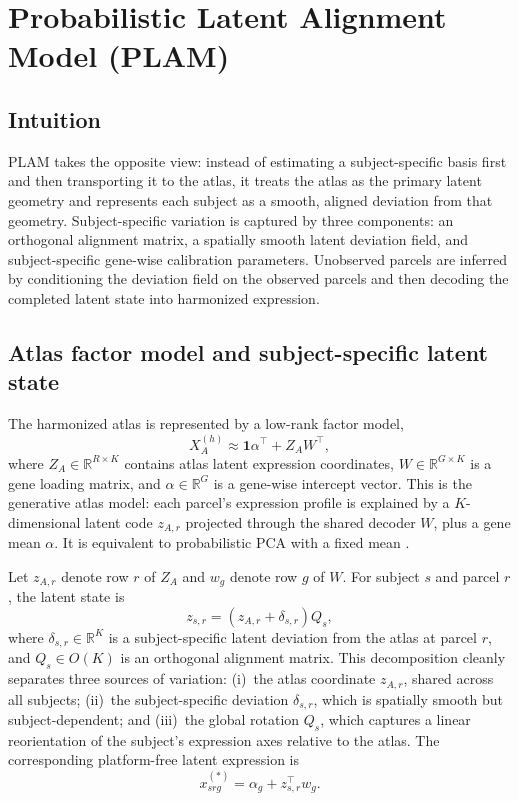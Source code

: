 \documentclass[11pt]{article}
\numberwithin{equation}{section}
\begin{document}
\section{Probabilistic Latent Alignment Model (PLAM)}
\subsection{Intuition}
PLAM takes the opposite view: instead of estimating a
subject-specific basis first and then transporting it to the atlas, it treats the atlas
as the primary latent geometry and represents each subject as a smooth, aligned
deviation from that geometry.  Subject-specific variation is captured by three
components: an orthogonal alignment matrix, a spatially smooth latent deviation field,
and subject-specific gene-wise calibration parameters.  Unobserved parcels are inferred
by conditioning the deviation field on the observed parcels and then decoding the
completed latent state into harmonized expression.

\subsection{Atlas factor model and subject-specific latent state}
The harmonized atlas is represented by a low-rank factor model,
\begin{equation}
  \label{eq:prob-atlas-factor}
  X_A^{(h)} \approx \mathbf{1}\alpha^\top + Z_A W^\top,
\end{equation}
where $Z_A\in\mathbb{R}^{R\times K}$ contains atlas latent expression coordinates,
$W\in\mathbb{R}^{G\times K}$ is a gene loading matrix, and $\alpha\in\mathbb{R}^G$ is
a gene-wise intercept vector.  This is the generative atlas model: each parcel's
expression profile is explained by a $K$-dimensional latent code $z_{A,r}$ projected
through the shared decoder $W$, plus a gene mean $\alpha$.  It is equivalent to
probabilistic PCA with a fixed mean \cite{tipping1999ppca}.

Let $z_{A,r}$ denote row $r$ of $Z_A$ and $w_g$ denote row $g$ of $W$.  For subject
$s$ and parcel $r$, the latent state is
\begin{equation}
  \label{eq:prob-latent-state}
  z_{s,r} = \left(z_{A,r} + \delta_{s,r}\right)Q_s,
\end{equation}
where $\delta_{s,r}\in\mathbb{R}^K$ is a subject-specific latent deviation from the
atlas at parcel $r$, and $Q_s\in O(K)$ is an orthogonal alignment matrix.  This
decomposition cleanly separates three sources of variation: (i)~the atlas coordinate
$z_{A,r}$, shared across all subjects; (ii)~the subject-specific deviation
$\delta_{s,r}$, which is spatially smooth but subject-dependent; and (iii)~the global
rotation $Q_s$, which captures a linear reorientation of the subject's expression axes
relative to the atlas.  The corresponding platform-free latent expression is
\begin{equation}
  \label{eq:prob-latent-expression}
  x_{srg}^{(*)} = \alpha_g + z_{s,r}^\top w_g.
\end{equation}
\end{document}
